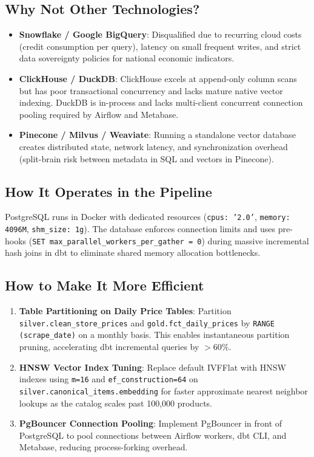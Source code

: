 \documentclass[a4paper, 11pt]{article}
\begin{document}
\subsection{Why Not Other Technologies?}
\begin{itemize}[leftmargin=*]
    \item \textbf{Snowflake / Google BigQuery}: Disqualified due to recurring cloud costs (credit consumption per query), latency on small frequent writes, and strict data sovereignty policies for national economic indicators.
    \item \textbf{ClickHouse / DuckDB}: ClickHouse excels at append-only column scans but has poor transactional concurrency and lacks mature native vector indexing. DuckDB is in-process and lacks multi-client concurrent connection pooling required by Airflow and Metabase.
    \item \textbf{Pinecone / Milvus / Weaviate}: Running a standalone vector database creates distributed state, network latency, and synchronization overhead (split-brain risk between metadata in SQL and vectors in Pinecone).
\end{itemize}

\subsection{How It Operates in the Pipeline}
PostgreSQL runs in Docker with dedicated resources (\texttt{cpus: '2.0'}, \texttt{memory: 4096M}, \texttt{shm\_size: 1g}). The database enforces connection limits and uses pre-hooks (\texttt{SET max\_parallel\_workers\_per\_gather = 0}) during massive incremental hash joins in dbt to eliminate shared memory allocation bottlenecks.

\subsection{How to Make It More Efficient}
\begin{tcolorbox}[colback=accentgreen!10, colframe=accentgreen, title=Optimization Recommendations for PostgreSQL]
\begin{enumerate}[leftmargin=*]
    \item \textbf{Table Partitioning on Daily Price Tables}: Partition \texttt{silver.clean\_store\_prices} and \texttt{gold.fct\_daily\_prices} by \texttt{RANGE (scrape\_date)} on a monthly basis. This enables instantaneous partition pruning, accelerating dbt incremental queries by $>60\%$.
    \item \textbf{HNSW Vector Index Tuning}: Replace default IVFFlat with HNSW indexes using \texttt{m=16} and \texttt{ef\_construction=64} on \texttt{silver.canonical\_items.embedding} for faster approximate nearest neighbor lookups as the catalog scales past 100,000 products.
    \item \textbf{PgBouncer Connection Pooling}: Implement PgBouncer in front of PostgreSQL to pool connections between Airflow workers, dbt CLI, and Metabase, reducing process-forking overhead.
\end{enumerate}
\end{tcolorbox}
\end{document}
